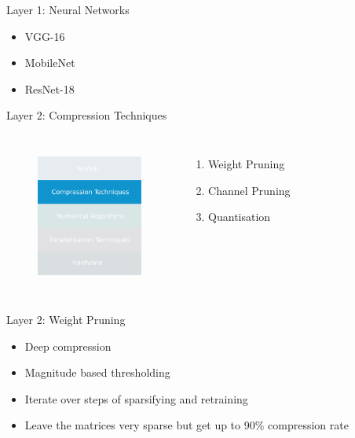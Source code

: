 \documentclass{beamer}
\begin{document}
\begin{frame}{Layer 1: Neural Networks}
\vspace{0.2cm}

\begin{itemize}
    \item VGG-16
    \item MobileNet
    \item ResNet-18
\end{itemize}

\end{frame}


\begin{frame}{Layer 2: Compression Techniques}

\begin{columns}
\begin{figure}
    \centering
    \includegraphics[width=3.5cm]{images/compressions.pdf}
    \label{fig:inference-stack-compress-1}
\end{figure}


\begin{enumerate}
    \item Weight Pruning
    \item Channel Pruning
    \item Quantisation
\end{enumerate}


\end{columns}

\end{frame}



\begin{frame}{Layer 2: Weight Pruning}

\begin{itemize}
    \item Deep compression
    \item Magnitude based thresholding 
    \item Iterate over steps of sparsifying and retraining 
    \item Leave the matrices very sparse but get up to 90\% compression rate
\end{itemize}
    
\end{frame}
\end{document}
